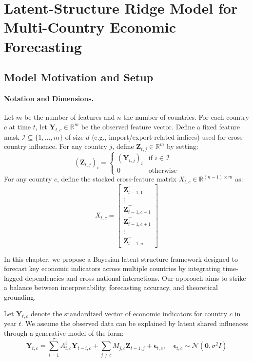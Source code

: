 \documentclass[12pt]{article}
\begin{document}
\section{Latent-Structure Ridge Model for Multi-Country Economic Forecasting}

\subsection{Model Motivation and Setup}

\paragraph{Notation and Dimensions.}
Let $m$ be the number of features and $n$ the number of countries. For each country $c$ at time $t$, let $\mathbf{Y}_{t,c} \in \mathbb{R}^m$ be the observed feature vector. Define a fixed feature mask $\mathcal{I} \subseteq \{1, \ldots, m\}$ of size $d$ (e.g., import/export-related indices) used for cross-country influence. For any country $j$, define $\mathbf{Z}_{t,j} \in \mathbb{R}^m$ by setting:
\[
\left(\mathbf{Z}_{t,j}\right)_i = 
\begin{cases}
\left(\mathbf{Y}_{t,j}\right)_i & \text{if } i \in \mathcal{I} \\
0 & \text{otherwise}
\end{cases}
\]
For any country $c$, define the stacked cross-feature matrix $X_{t,c} \in \mathbb{R}^{(n-1) \times m}$ as:
\[
X_{t,c} = \begin{bmatrix}
\mathbf{Z}_{t-1,1}^\top \\
\vdots \\
\mathbf{Z}_{t-1,c-1}^\top \\
\mathbf{Z}_{t-1,c+1}^\top \\
\vdots \\
\mathbf{Z}_{t-1,n}^\top
\end{bmatrix}
\]

In this chapter, we propose a Bayesian latent structure framework designed to forecast key economic indicators across multiple countries by integrating time-lagged dependencies and cross-national interactions. Our approach aims to strike a balance between interpretability, forecasting accuracy, and theoretical grounding.

Let $\mathbf{Y}_{t,c}$ denote the standardized vector of economic indicators for country $c$ in year $t$. We assume the observed data can be explained by latent shared influences through a generative model of the form:
\[
\mathbf{Y}_{t,c} = \sum_{i=1}^\tau  A_{t,c}^i \mathbf{Y}_{t - i,c} + \sum_{j \neq c} M_{j,c} \mathbf{Z}_{t-1,j} + \boldsymbol{\epsilon}_{t,c}, \quad \boldsymbol{\epsilon}_{t,c} \sim \mathcal{N}(\mathbf{0}, \sigma^2 I)
\]
\end{document}
